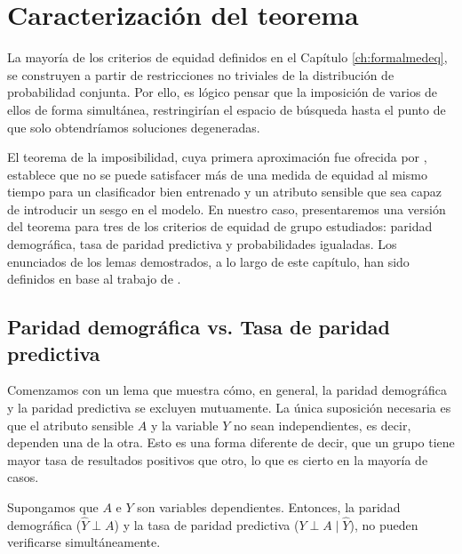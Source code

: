 \documentclass[oneside,openright,titlepage,numbers=noenddot,openany,headinclude,footinclude=true,
cleardoublepage=empty,abstractoff,BCOR=5mm,paper=a4,fontsize=12pt,main=spanish]{scrreprt}
\begin{document}
\section{Caracterización del teorema}

La mayoría de los criterios de equidad definidos en el Capítulo \ref{ch:formalmedeq}, se construyen a partir de restricciones no triviales de la distribución de probabilidad conjunta. Por ello, es lógico pensar que la imposición de varios de ellos de forma simultánea, restringirían el espacio de búsqueda hasta el punto de que solo obtendríamos soluciones degeneradas.

El teorema de la imposibilidad, cuya primera aproximación fue ofrecida por \cite{fairth2016}, establece que no se puede satisfacer más de una medida de equidad al mismo tiempo para un clasificador bien entrenado y un atributo sensible que sea capaz de introducir un sesgo en el modelo. En nuestro caso, presentaremos una versión del teorema para tres de los criterios de equidad de grupo estudiados: paridad demográfica, tasa de paridad predictiva y probabilidades igualadas. Los enunciados de los lemas demostrados, a lo largo de este capítulo, han sido definidos en base al trabajo de \cite{fairnesslearning2019}.


\subsection{Paridad demográfica vs. Tasa de paridad predictiva}

Comenzamos con un lema que muestra cómo, en general, la paridad demográfica y la paridad predictiva se excluyen mutuamente. La única suposición necesaria es que el atributo sensible $A$ y la variable $Y$ no sean independientes, es decir, dependen una de la otra. Esto es una forma diferente de decir, que un grupo tiene mayor tasa de resultados positivos que otro, lo que es cierto en la mayoría de casos.

\clearpage

\begin{lemma} 
Supongamos que $A$ e $Y$ son variables dependientes. Entonces, la paridad demográfica ($\hat{Y} \perp A$) y la tasa de paridad predictiva ($Y \perp A \mid \hat{Y}$), no pueden verificarse simultáneamente.
\label{lem:demopred}
\end{lemma}
\end{document}
